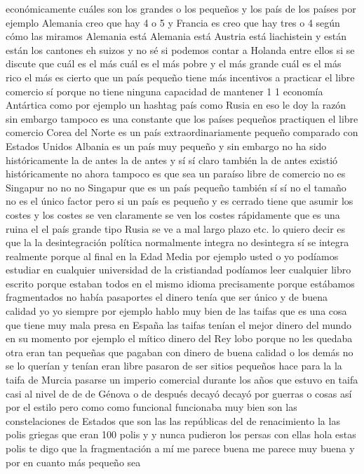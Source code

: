 económicamente cuáles son los grandes o los pequeños y los país de los países por ejemplo Alemania creo que hay 4 o 5
y Francia es creo que hay tres o 4 según cómo las miramos Alemania está Alemania está Austria está liachistein
y están están los cantones eh suizos y no sé si podemos contar a Holanda entre ellos
si se discute que cuál es el más cuál es el más pobre y el más grande cuál es el más rico el más es cierto que un país pequeño
tiene más incentivos a practicar el libre comercio sí porque no tiene ninguna capacidad de mantener 1 1 economía Antártica
como por ejemplo un hashtag país como Rusia en eso le doy la razón sin embargo tampoco es una constante
que los países pequeños practiquen el libre comercio Corea del Norte es un país extraordinariamente pequeño comparado con Estados Unidos
Albania es un país muy pequeño y sin embargo no ha sido históricamente la de antes la de antes
y sí sí claro también la de antes existió históricamente no ahora tampoco es que sea un paraíso libre de comercio
no es Singapur no no no Singapur que es un país pequeño también sí sí no
el tamaño no es el único factor pero si un país es pequeño y es cerrado
tiene que asumir los costes y los costes se ven claramente se ven los costes rápidamente que es una ruina el el país grande tipo Rusia
se ve a mal largo plazo etc. lo quiero decir es que la la desintegración política normalmente
integra no desintegra sí se integra realmente porque al final
en la Edad Media por ejemplo usted o yo podíamos estudiar en cualquier universidad de la cristiandad podíamos leer cualquier libro escrito
porque estaban todos en el mismo idioma precisamente porque estábamos fragmentados no había pasaportes el dinero tenía que ser único y de buena calidad
yo yo siempre por ejemplo hablo muy bien de las taifas que es una cosa que tiene muy mala presa en España
las taifas tenían el mejor dinero del mundo en su momento por ejemplo el mítico dinero del Rey lobo
porque no les quedaba otra eran tan pequeñas que pagaban con dinero de buena calidad o los demás no se lo querían y tenían eran libre
pasaron de ser sitios pequeños hace para la la taifa de Murcia pasarse un imperio comercial
durante los años que estuvo en taifa casi al nivel de de de Génova o de después decayó decayó por guerras o cosas así por el estilo
pero como como funcional funcionaba muy bien son las constelaciones de Estados que son las las repúblicas del de renacimiento
la las polis griegas que eran 100 polis y y nunca pudieron los persas con ellas
hola estas polis te digo que la fragmentación a mí me parece buena me parece muy buena y por en cuanto más pequeño sea
